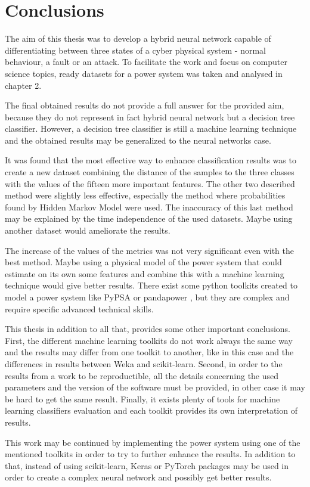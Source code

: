 \chapter{Conclusions}

The aim of this thesis was to develop a hybrid neural network capable of differentiating between three states of a cyber physical system - normal behaviour, a fault or an attack. To facilitate the work and focus on computer science topics, ready datasets for a power system was taken and analysed in chapter 2. 

The final obtained results do not provide a full answer for the provided aim, because they do not represent in fact hybrid neural network but a decision tree classifier. However, a decision tree classifier is still a machine learning technique and the obtained results may be generalized to the neural networks case.

It was found that the most effective way to enhance classification results was to create a new dataset combining the distance of the samples to the three classes with the values of the fifteen more important features. The other two described method were slightly less effective, especially the method where probabilities found by Hidden Markov Model were used. The inaccuracy of this last method may be explained by the time independence of the used datasets. Maybe using another dataset would ameliorate the results.

The increase of the values of the metrics was not very significant even with the best method. Maybe using a physical model of the power system that could estimate on its own some features and combine this with a machine learning technique would give better results. There exist some python toolkits created to model a power system like PyPSA \cite{brown_pypsapypsa_2020} or pandapower \cite{noauthor_pandapower_nodate}, but they are complex and require specific advanced technical skills.

This thesis in addition to all that, provides some other important conclusions. First, the different machine learning toolkits do not work always the same way and the results may differ from one toolkit to another, like in this case and the differences in results between Weka and scikit-learn. Second, in order to the results from a work to be reproductible, all the details concerning the used parameters and the version of the software must be provided, in other case it may be hard to get the same result. Finally, it exists plenty of tools for machine learning classifiers evaluation and each toolkit provides its own interpretation of results.

This work may be continued by implementing the power system using one of the mentioned toolkits in order to try to further enhance the results. In addition to that, instead of using scikit-learn, Keras \cite{noauthor_keras_nodate} or PyTorch \cite{noauthor_pytorch_nodate} packages may be used in order to create a complex neural network and possibly get better results.   
